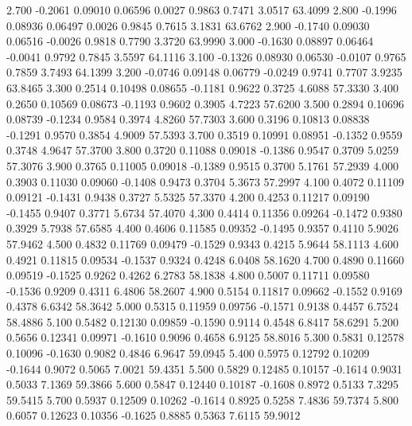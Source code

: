    2.700  -0.2061   0.09010   0.06596   0.0027   0.9863   0.7471   3.0517  63.4099
   2.800  -0.1996   0.08936   0.06497   0.0026   0.9845   0.7615   3.1831  63.6762
   2.900  -0.1740   0.09030   0.06516  -0.0026   0.9818   0.7790   3.3720  63.9990
   3.000  -0.1630   0.08897   0.06464  -0.0041   0.9792   0.7845   3.5597  64.1116
   3.100  -0.1326   0.08930   0.06530  -0.0107   0.9765   0.7859   3.7493  64.1399
   3.200  -0.0746   0.09148   0.06779  -0.0249   0.9741   0.7707   3.9235  63.8465
   3.300   0.2514   0.10498   0.08655  -0.1181   0.9622   0.3725   4.6088  57.3330
   3.400   0.2650   0.10569   0.08673  -0.1193   0.9602   0.3905   4.7223  57.6200
   3.500   0.2894   0.10696   0.08739  -0.1234   0.9584   0.3974   4.8260  57.7303
   3.600   0.3196   0.10813   0.08838  -0.1291   0.9570   0.3854   4.9009  57.5393
   3.700   0.3519   0.10991   0.08951  -0.1352   0.9559   0.3748   4.9647  57.3700
   3.800   0.3720   0.11088   0.09018  -0.1386   0.9547   0.3709   5.0259  57.3076
   3.900   0.3765   0.11005   0.09018  -0.1389   0.9515   0.3700   5.1761  57.2939
   4.000   0.3903   0.11030   0.09060  -0.1408   0.9473   0.3704   5.3673  57.2997
   4.100   0.4072   0.11109   0.09121  -0.1431   0.9438   0.3727   5.5325  57.3370
   4.200   0.4253   0.11217   0.09190  -0.1455   0.9407   0.3771   5.6734  57.4070
   4.300   0.4414   0.11356   0.09264  -0.1472   0.9380   0.3929   5.7938  57.6585
   4.400   0.4606   0.11585   0.09352  -0.1495   0.9357   0.4110   5.9026  57.9462
   4.500   0.4832   0.11769   0.09479  -0.1529   0.9343   0.4215   5.9644  58.1113
   4.600   0.4921   0.11815   0.09534  -0.1537   0.9324   0.4248   6.0408  58.1620
   4.700   0.4890   0.11660   0.09519  -0.1525   0.9262   0.4262   6.2783  58.1838
   4.800   0.5007   0.11711   0.09580  -0.1536   0.9209   0.4311   6.4806  58.2607
   4.900   0.5154   0.11817   0.09662  -0.1552   0.9169   0.4378   6.6342  58.3642
   5.000   0.5315   0.11959   0.09756  -0.1571   0.9138   0.4457   6.7524  58.4886
   5.100   0.5482   0.12130   0.09859  -0.1590   0.9114   0.4548   6.8417  58.6291
   5.200   0.5656   0.12341   0.09971  -0.1610   0.9096   0.4658   6.9125  58.8016
   5.300   0.5831   0.12578   0.10096  -0.1630   0.9082   0.4846   6.9647  59.0945
   5.400   0.5975   0.12792   0.10209  -0.1644   0.9072   0.5065   7.0021  59.4351
   5.500   0.5829   0.12485   0.10157  -0.1614   0.9031   0.5033   7.1369  59.3866
   5.600   0.5847   0.12440   0.10187  -0.1608   0.8972   0.5133   7.3295  59.5415
   5.700   0.5937   0.12509   0.10262  -0.1614   0.8925   0.5258   7.4836  59.7374
   5.800   0.6057   0.12623   0.10356  -0.1625   0.8885   0.5363   7.6115  59.9012
